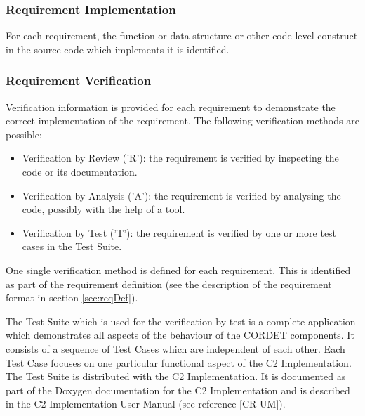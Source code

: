 \documentclass{pnp_article}
\begin{document}
\subsubsection{Requirement Implementation}
For each requirement, the function or data structure or other code-level construct in the source code which implements it is identified.

\subsubsection{Requirement Verification}\label{sec:reqVer}
Verification information is provided for each requirement to demonstrate the correct implementation of the requirement. The following verification methods are possible:

\begin{itemize}
\item Verification by Review ('R'): the requirement is verified by inspecting the code or its documentation.
\item Verification by Analysis ('A'): the requirement is verified by analysing the code, possibly with the help of a tool.
\item Verification by Test ('T'): the requirement is verified by one or more test cases in the Test Suite.
\end{itemize}

One single verification method is defined for each requirement. 
This is identified as part of the requirement definition (see the description of the requirement format in section \ref{sec:reqDef}).

The Test Suite which is used for the verification by test is a complete application which demonstrates all aspects of the behaviour of the CORDET components. It consists of a sequence of Test Cases which are independent of each other. Each Test Case focuses on one particular functional aspect of the C2 Implementation. The Test Suite is distributed with the C2 Implementation. It is documented as part of the Doxygen documentation for the C2 Implementation and is described in the C2 Implementation User Manual (see reference [CR-UM]).


\let\stdsubsection\subsection
\renewcommand\subsection{\newpage\stdsubsection}
\end{document}

